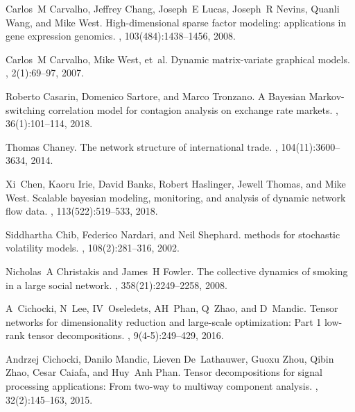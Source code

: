 \documentclass[12pt,a4paper]{article}
\theoremstyle{custom}
\begin{document}
\begin{thebibliography}{10}
Carlos~M Carvalho, Jeffrey Chang, Joseph~E Lucas, Joseph~R Nevins, Quanli Wang,
  and Mike West.
\newblock High-dimensional sparse factor modeling: applications in gene
  expression genomics.
,
  103(484):1438--1456, 2008.

Carlos~M Carvalho, Mike West, et~al.
\newblock Dynamic matrix-variate graphical models.
, 2(1):69--97, 2007.

Roberto Casarin, Domenico Sartore, and Marco Tronzano.
\newblock A {Bayesian} {Markov-switching} correlation model for contagion
  analysis on exchange rate markets.
, 36(1):101--114,
  2018.

Thomas Chaney.
\newblock The network structure of international trade.
, 104(11):3600--3634, 2014.

Xi~Chen, Kaoru Irie, David Banks, Robert Haslinger, Jewell Thomas, and Mike
  West.
\newblock Scalable bayesian modeling, monitoring, and analysis of dynamic
  network flow data.
,
  113(522):519--533, 2018.

Siddhartha Chib, Federico Nardari, and Neil Shephard.
 methods for stochastic volatility models.
, 108(2):281--316, 2002.

Nicholas~A Christakis and James~H Fowler.
\newblock The collective dynamics of smoking in a large social network.
, 358(21):2249--2258, 2008.

A~Cichocki, N~Lee, IV~Oseledets, AH~Phan, Q~Zhao, and D~Mandic.
\newblock Tensor networks for dimensionality reduction and large-scale
  optimization: Part 1 low-rank tensor decompositions.
, 9(4-5):249--429,
  2016.

Andrzej Cichocki, Danilo Mandic, Lieven De~Lathauwer, Guoxu Zhou, Qibin Zhao,
  Cesar Caiafa, and Huy~Anh Phan.
\newblock Tensor decompositions for signal processing applications: From
  two-way to multiway component analysis.
, 32(2):145--163, 2015.


\end{thebibliography}
\end{document}
